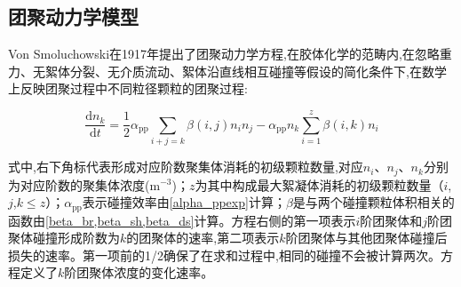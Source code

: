 \subsection{团聚动力学模型}

Von Smoluchowski在1917年提出了团聚动力学方程\cite{Smoluchowski-752},在胶体化学的范畴内,在忽略重力、无絮体分裂、无介质流动、絮体沿直线相互碰撞等假设的简化条件下,在数学上反映团聚过程中不同粒径颗粒的团聚过程\cite{Smoluchowski-752}:

\begin{equation}\label{smoluchowski}
    \frac{\mathrm{d}n_k}{\mathrm{d}t}=\frac{1}{2}\alpha_\mathrm{pp}\sum_{i+j=k}{\beta(i,j)n_in_j}-\alpha_\mathrm{pp} n_k\sum_{i=1}^{z}{\beta(i,k)n_i}
\end{equation}

式中,右下角标代表形成对应阶数聚集体消耗的初级颗粒数量,对应$n_i$、$n_j$、$n_k$分别为对应阶数的聚集体浓度($\mathrm{m^{-3}}$)；$z$为其中构成最大絮凝体消耗的初级颗粒数量（$i$,$j$,$k\leq z$）；$\alpha_\mathrm{pp}$表示碰撞效率由\cref{alpha_ppexp}计算；$\beta$是与两个碰撞颗粒体积相关的函数由\cref{beta_br,beta_sh,beta_ds}计算。方程右侧的第一项表示$i$阶团聚体和$j$阶团聚体碰撞形成阶数为$k$的团聚体的速率,第二项表示$k$阶团聚体与其他团聚体碰撞后损失的速率。第一项前的1/2确保了在求和过程中,相同的碰撞不会被计算两次。方程定义了$k$阶团聚体浓度的变化速率。
